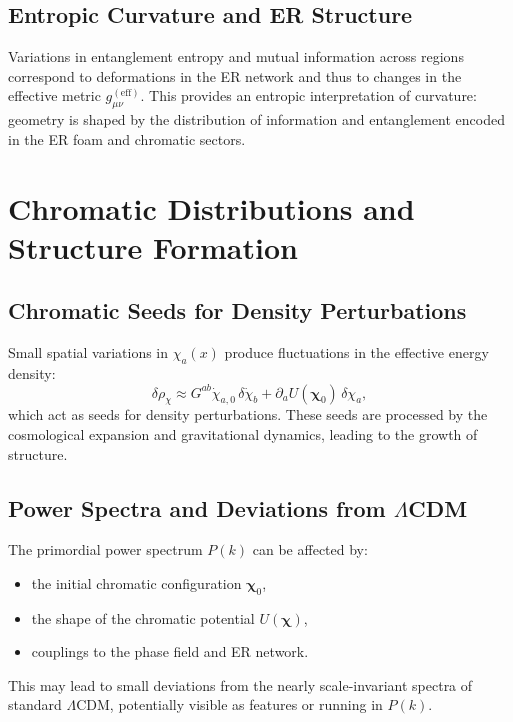 \section{Entropic Curvature and ER Structure}

Variations in entanglement entropy and mutual information across regions correspond to deformations in the ER network and thus to changes in the effective metric $g_{\mu\nu}^{\mathrm{(eff)}}$.
This provides an entropic interpretation of curvature:
geometry is shaped by the distribution of information and entanglement encoded in the ER foam and chromatic sectors.


\chapter{Chromatic Distributions and Structure Formation}

\section{Chromatic Seeds for Density Perturbations}

Small spatial variations in $\chi_a(x)$ produce fluctuations in the effective energy density:
\[
  \delta \rho_\chi \approx G^{ab}\dot{\chi}_{a,0}\,\delta\dot{\chi}_b + \partial_a U(\bm{\chi}_0)\,\delta\chi_a,
\]
which act as seeds for density perturbations.
These seeds are processed by the cosmological expansion and gravitational dynamics, leading to the growth of structure.

\section{Power Spectra and Deviations from \texorpdfstring{$\Lambda$}{Lambda}CDM}

The primordial power spectrum $P(k)$ can be affected by:
\begin{itemize}
  \item the initial chromatic configuration $\bm{\chi}_0$,
  \item the shape of the chromatic potential $U(\bm{\chi})$,
  \item couplings to the phase field and ER network.
\end{itemize}
This may lead to small deviations from the nearly scale-invariant spectra of standard $\Lambda$CDM, potentially visible as features or running in $P(k)$.


